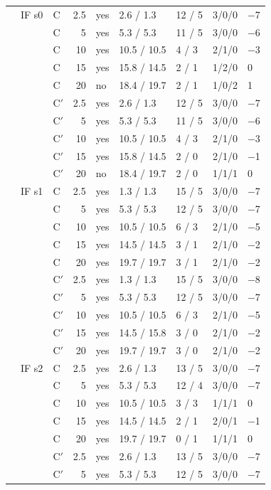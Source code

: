\begin{scriptsize}
\begin{longtable}{lllrlllll}
 & IF s0 & C & 2.5 & yes & 2.6 / 1.3 & 12 / 5 & 3/0/0 & $-$7 \\
 &  & C & 5 & yes & 5.3 / 5.3 & 11 / 5 & 3/0/0 & $-$6 \\
 &  & C & 10 & yes & 10.5 / 10.5 & 4 / 3 & 2/1/0 & $-$3 \\
 &  & C & 15 & yes & 15.8 / 14.5 & 2 / 1 & 1/2/0 & 0 \\
 &  & C & 20 & no & 18.4 / 19.7 & 2 / 1 & 1/0/2 & 1 \\
 &  & C$'$ & 2.5 & yes & 2.6 / 1.3 & 12 / 5 & 3/0/0 & $-$7 \\
 &  & C$'$ & 5 & yes & 5.3 / 5.3 & 11 / 5 & 3/0/0 & $-$6 \\
 &  & C$'$ & 10 & yes & 10.5 / 10.5 & 4 / 3 & 2/1/0 & $-$3 \\
 &  & C$'$ & 15 & yes & 15.8 / 14.5 & 2 / 0 & 2/1/0 & $-$1 \\
 &  & C$'$ & 20 & no & 18.4 / 19.7 & 2 / 0 & 1/1/1 & 0 \\
 & IF s1 & C & 2.5 & yes & 1.3 / 1.3 & 15 / 5 & 3/0/0 & $-$7 \\
 &  & C & 5 & yes & 5.3 / 5.3 & 12 / 5 & 3/0/0 & $-$7 \\
 &  & C & 10 & yes & 10.5 / 10.5 & 6 / 3 & 2/1/0 & $-$5 \\
 &  & C & 15 & yes & 14.5 / 14.5 & 3 / 1 & 2/1/0 & $-$2 \\
 &  & C & 20 & yes & 19.7 / 19.7 & 3 / 1 & 2/1/0 & $-$2 \\
 &  & C$'$ & 2.5 & yes & 1.3 / 1.3 & 15 / 5 & 3/0/0 & $-$8 \\
 &  & C$'$ & 5 & yes & 5.3 / 5.3 & 12 / 5 & 3/0/0 & $-$7 \\
 &  & C$'$ & 10 & yes & 10.5 / 10.5 & 6 / 3 & 2/1/0 & $-$5 \\
 &  & C$'$ & 15 & yes & 14.5 / 15.8 & 3 / 0 & 2/1/0 & $-$2 \\
 &  & C$'$ & 20 & yes & 19.7 / 19.7 & 3 / 0 & 2/1/0 & $-$2 \\
 & IF s2 & C & 2.5 & yes & 2.6 / 1.3 & 13 / 5 & 3/0/0 & $-$7 \\
 &  & C & 5 & yes & 5.3 / 5.3 & 12 / 4 & 3/0/0 & $-$7 \\
 &  & C & 10 & yes & 10.5 / 10.5 & 3 / 3 & 1/1/1 & 0 \\
 &  & C & 15 & yes & 14.5 / 14.5 & 2 / 1 & 2/0/1 & $-$1 \\
 &  & C & 20 & yes & 19.7 / 19.7 & 0 / 1 & 1/1/1 & 0 \\
 &  & C$'$ & 2.5 & yes & 2.6 / 1.3 & 13 / 5 & 3/0/0 & $-$7 \\
 &  & C$'$ & 5 & yes & 5.3 / 5.3 & 12 / 5 & 3/0/0 & $-$7 \\

\end{longtable}
\end{scriptsize}
